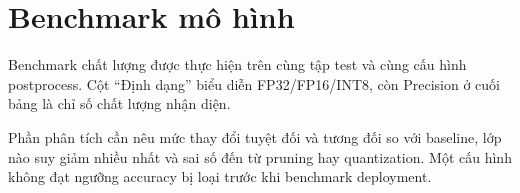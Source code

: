 \section{Benchmark mô hình}

Benchmark chất lượng được thực hiện trên cùng tập test và cùng cấu hình
postprocess. Cột ``Định dạng'' biểu diễn FP32/FP16/INT8, còn Precision ở cuối
bảng là chỉ số chất lượng nhận diện.

\begin{landscape}
\begin{table}[H]
\centering
\caption{Kết quả accuracy của các cấu hình tối ưu}
\label{tab:model-accuracy-benchmark}
\end{table}
\end{landscape}

Phần phân tích cần nêu mức thay đổi tuyệt đối và tương đối so với baseline, lớp
nào suy giảm nhiều nhất và sai số đến từ pruning hay quantization. Một cấu hình
không đạt ngưỡng accuracy bị loại trước khi benchmark deployment.